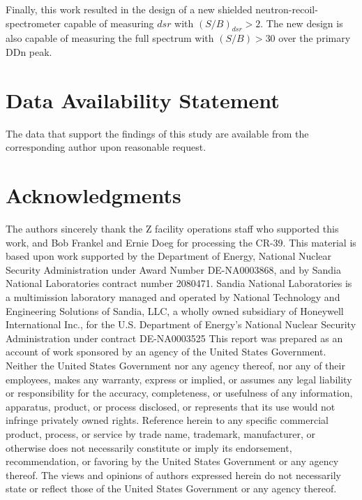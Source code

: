 Finally, this work resulted in the design of a new shielded neutron-recoil-spectrometer capable of measuring $dsr$ with $(S/B)_{dsr} > 2$. The new design is also capable of measuring the full spectrum with $(S/B) > 30$ over the primary DDn peak.  

\section*{Data Availability Statement}

The data that support the findings of this study are available from the corresponding author upon reasonable request.

\section*{Acknowledgments}

The authors sincerely thank the Z facility operations staff who supported this work, and Bob Frankel and Ernie Doeg for processing the CR-39. This material is based upon work supported by the Department of Energy, National Nuclear Security Administration under Award Number DE-NA0003868, and by Sandia National Laboratories contract number 2080471. Sandia National Laboratories is a multimission laboratory managed and operated by National Technology and Engineering Solutions of Sandia, LLC, a wholly owned subsidiary of Honeywell International Inc., for the U.S. Department of Energy's National Nuclear Security Administration under contract DE-NA0003525 This report was prepared as an account of work sponsored by an agency of the United States Government. Neither the United States Government nor any agency thereof, nor any of their employees, makes any warranty, express or implied, or assumes any legal liability or responsibility for the accuracy, completeness, or usefulness of any information, apparatus, product, or process disclosed, or represents that its use would not infringe privately owned rights.  Reference herein to any specific commercial product, process, or service by trade name, trademark, manufacturer, or otherwise does not necessarily constitute or imply its endorsement, recommendation, or favoring by the United States Government or any agency thereof. The views and opinions of authors expressed herein do not necessarily state or reflect those of the United States Government or any agency thereof.


\begin{singlespace}
    \begin{flushleft}
        
	    
    \end{flushleft}
\end{singlespace}